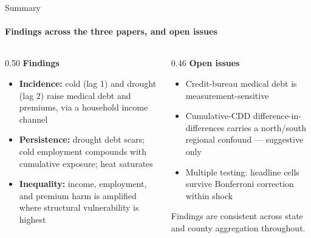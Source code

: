 \documentclass[aspectratio=169,11pt]{beamer}
\newcommand{\emphcolor}[1]{{\color{WarmOrange}\textbf{#1}}}
\newcommand{\tealtext}[1]{{\color{Teal}#1}}
\newcommand{\graytext}[1]{{\color{WarmGray}#1}}
\begin{document}
\begin{frame}{Summary}
  \framesubtitle{Findings across the three papers, and open issues}
  \begin{columns}[T]
    \begin{column}{0.50\textwidth}
      \textbf{\tealtext{Findings}}
      \begin{itemize}\itemsep0.16em
        \item \emphcolor{Incidence:} cold (lag 1) and drought (lag 2) raise medical debt and premiums, via a household income channel
        \item \emphcolor{Persistence:} drought debt scars; cold employment compounds with cumulative exposure; heat saturates
        \item \emphcolor{Inequality:} income, employment, and premium harm is amplified where structural vulnerability is highest
      \end{itemize}
    \end{column}
    \begin{column}{0.46\textwidth}
      \textbf{\tealtext{Open issues}}
      \begin{itemize}\itemsep0.16em
        \item Credit-bureau medical debt is measurement-sensitive
        \item Cumulative-CDD difference-in-differences carries a north/south regional confound --- suggestive only
        \item Multiple testing: headline cells survive Bonferroni correction within shock
      \end{itemize}
      \vspace{0.35em}
      \graytext{\scriptsize Findings are consistent across state and county aggregation throughout.}
    \end{column}
  \end{columns}
\end{frame}
\end{document}
